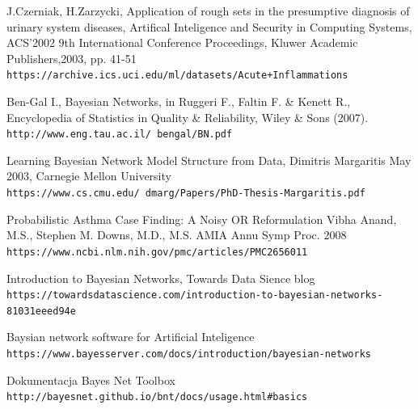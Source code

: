 \documentclass[12pt]{article}
\begin{document}
\newpage
\begin{thebibliography}{9}

J.Czerniak, H.Zarzycki, Application of rough sets in the presumptive diagnosis of urinary system diseases, 
Artifical Inteligence and Security in Computing Systems, ACS'2002 9th International Conference Proceedings, 
Kluwer Academic Publishers,2003, pp. 41-51 
\\\texttt{https://archive.ics.uci.edu/ml/datasets/Acute+Inflammations}

Ben-Gal I., Bayesian Networks, in Ruggeri F., Faltin F. \& Kenett R.,
Encyclopedia of Statistics in Quality \& Reliability, Wiley \& Sons (2007). 
\\\texttt{http://www.eng.tau.ac.il/~bengal/BN.pdf}

Learning Bayesian Network Model Structure from Data, Dimitris Margaritis
May 2003, Carnegie Mellon University
\\\texttt{https://www.cs.cmu.edu/~dmarg/Papers/PhD-Thesis-Margaritis.pdf}

Probabilistic Asthma Case Finding: A Noisy OR Reformulation
Vibha Anand, M.S., Stephen M. Downs, M.D., M.S.
AMIA Annu Symp Proc. 2008
\\\texttt{https://www.ncbi.nlm.nih.gov/pmc/articles/PMC2656011}

Introduction to Bayesian Networks, Towards Data Sience blog
\\\texttt{https://towardsdatascience.com/introduction-to-bayesian-networks-81031eeed94e}

Baysian network software for Artificial Inteligence
\\\texttt{https://www.bayesserver.com/docs/introduction/bayesian-networks}

Dokumentacja Bayes Net Toolbox
\\\texttt{http://bayesnet.github.io/bnt/docs/usage.html\#basics}

\end{thebibliography}
\newpage

\listoffigures
\newpage

\listoftables
\newpage
\end{document}
